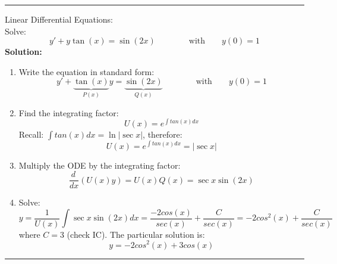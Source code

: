 \begin{center}
\noindent\rule{4cm}{0.4pt}
\end{center} 

\begin{exmp}{Linear Differential Equations:}\\
Solve:
\begin{equation}
y'+y \tan(x) =\sin(2x) \qquad \qquad \text{with}\qquad y(0)=1
\end{equation}
\textbf{Solution:}\\
\begin{enumerate}
\item Write the equation in standard form:
\begin{equation*}
y'+\underbrace{\tan(x)}_{P(x)} y =\underbrace{\sin(2x)}_{Q(x)} \qquad \qquad \text{with}\qquad y(0)=1
\end{equation*}
\item Find the integrating factor:
 \begin{equation*}
U(x) = e^{\int tan(x) dx}
 \end{equation*}
 Recall: $\int tan(x) dx=\ln \left| \sec x\right|$, therefore:
  \begin{equation*}
U(x) = e^{\int tan(x) dx}=\left| \sec x \right |
 \end{equation*}
 \item Multiply the ODE by the integrating factor:
 \begin{equation*}
\frac{d\,}{dx} (U(x)y) = U(x)Q(x) = \sec x {\sin(2x)} 
\end{equation*}
\item Solve:
  \begin{equation*}
y = \frac{1}{U(x)} \int\sec x {\sin(2x)}dx =\frac{-2cos(x)}{sec(x)} + \frac{C}{sec(x)}= -2cos^2(x) + \frac{C}{sec(x)}
\end{equation*}
where $C=3$ (check IC).
The particular solution is:
  \begin{equation*}
y = -2cos^2(x) + 3cos(x)
\end{equation*}
\end{enumerate}
\end{exmp}
\begin{center}
\noindent\rule{4cm}{0.4pt}
\end{center}

\updateinfo[September 25, 2018]


